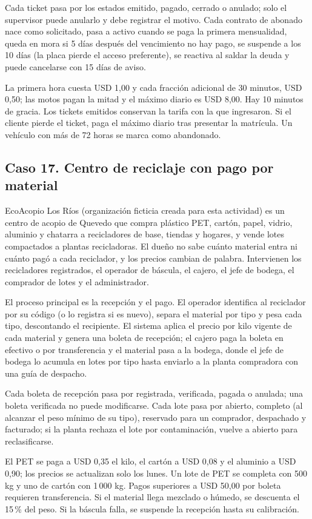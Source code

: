 \documentclass[11pt]{article}
\newcommand{\subseccion}[1]{\subsection{\textcolor{midblue}{#1}}}
\begin{document}
Cada ticket pasa por los estados emitido, pagado, cerrado o anulado; solo el supervisor puede anularlo y debe registrar el motivo. Cada contrato de abonado nace como solicitado, pasa a activo cuando se paga la primera mensualidad, queda en mora si 5 días después del vencimiento no hay pago, se suspende a los 10 días (la placa pierde el acceso preferente), se reactiva al saldar la deuda y puede cancelarse con 15 días de aviso.

La primera hora cuesta USD 1,00 y cada fracción adicional de 30 minutos, USD 0,50; las motos pagan la mitad y el máximo diario es USD 8,00. Hay 10 minutos de gracia. Los tickets emitidos conservan la tarifa con la que ingresaron. Si el cliente pierde el ticket, paga el máximo diario tras presentar la matrícula. Un vehículo con más de 72 horas se marca como abandonado.

\subseccion{Caso 17. Centro de reciclaje con pago por material}
EcoAcopio Los Ríos (organización ficticia creada para esta actividad) es un centro de acopio de Quevedo que compra plástico PET, cartón, papel, vidrio, aluminio y chatarra a recicladores de base, tiendas y hogares, y vende lotes compactados a plantas recicladoras. El dueño no sabe cuánto material entra ni cuánto pagó a cada reciclador, y los precios cambian de palabra. Intervienen los recicladores registrados, el operador de báscula, el cajero, el jefe de bodega, el comprador de lotes y el administrador.

El proceso principal es la recepción y el pago. El operador identifica al reciclador por su código (o lo registra si es nuevo), separa el material por tipo y pesa cada tipo, descontando el recipiente. El sistema aplica el precio por kilo vigente de cada material y genera una boleta de recepción; el cajero paga la boleta en efectivo o por transferencia y el material pasa a la bodega, donde el jefe de bodega lo acumula en lotes por tipo hasta enviarlo a la planta compradora con una guía de despacho.

Cada boleta de recepción pasa por registrada, verificada, pagada o anulada; una boleta verificada no puede modificarse. Cada lote pasa por abierto, completo (al alcanzar el peso mínimo de su tipo), reservado para un comprador, despachado y facturado; si la planta rechaza el lote por contaminación, vuelve a abierto para reclasificarse.

El PET se paga a USD 0,35 el kilo, el cartón a USD 0,08 y el aluminio a USD 0,90; los precios se actualizan solo los lunes. Un lote de PET se completa con 500 kg y uno de cartón con 1\,000 kg. Pagos superiores a USD 50,00 por boleta requieren transferencia. Si el material llega mezclado o húmedo, se descuenta el 15\,\% del peso. Si la báscula falla, se suspende la recepción hasta su calibración.
\end{document}
